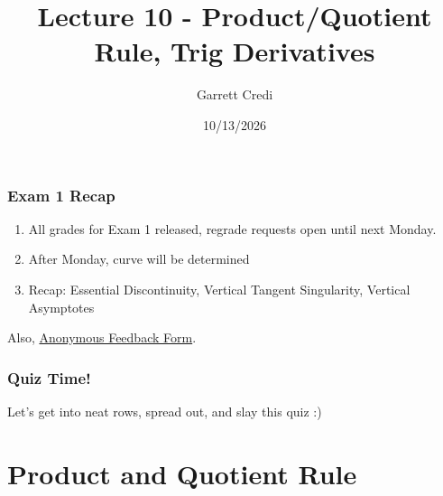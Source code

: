 \documentclass{ltx-talk}
\title{Lecture 10 - Product/Quotient Rule, Trig Derivatives}
\author{Garrett Credi}
\date{10/13/2026}
\begin{document}
\begin{frame}
  \maketitle
\end{frame}

\begin{frame}
  \frametitle{Exam 1 Recap}

  \begin{enumerate}
    \item All grades for Exam 1 released, regrade requests open until next Monday.
    \item After Monday, curve will be determined
    \item Recap: Essential Discontinuity, Vertical Tangent Singularity, Vertical Asymptotes
  \end{enumerate}

  Also, \href{https://forms.gle/GeHKGnT2nfTgQTGw8}{Anonymous Feedback Form}.
\end{frame}

\begin{frame}
  \frametitle{Quiz Time!}

  Let's get into neat rows, spread out, and slay this quiz :)
\end{frame}

\section{Product and Quotient Rule}
\end{document}
